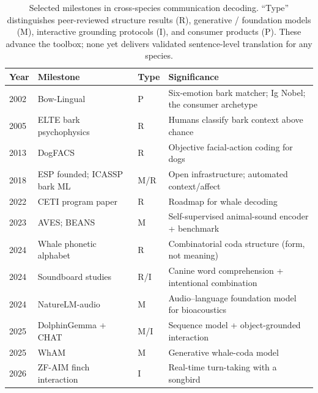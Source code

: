 \begin{table}[htbp]
\centering
\caption{Selected milestones in cross-species communication decoding.
``Type'' distinguishes peer-reviewed structure results (R), generative /
foundation models (M), interactive grounding protocols (I), and consumer
products (P). These advance the toolbox; none yet delivers validated
sentence-level translation for any species.}
\label{tab:milestones}
\small
\begin{tabular}{@{}p{1.0cm}p{4.4cm}p{0.9cm}p{5.7cm}@{}}
\toprule
\textbf{Year} & \textbf{Milestone} & \textbf{Type} & \textbf{Significance} \\
\midrule
2002 & Bow-Lingual~\cite{bowlingual2002} & P & Six-emotion bark matcher; Ig Nobel; the consumer archetype \\
2005 & ELTE bark psychophysics~\cite{pongracz2005barks} & R & Humans classify bark context above chance \\
2013 & DogFACS~\cite{waller2013dogfacs} & R & Objective facial-action coding for dogs \\
2018 & ESP founded; ICASSP bark ML~\cite{icassp2018dogbark} & M/R & Open infrastructure; automated context/affect \\
2022 & CETI program paper~\cite{andreas2022ceti} & R & Roadmap for whale decoding \\
2023 & AVES; BEANS~\cite{hagiwara2023aves,hagiwara2023beans} & M & Self-supervised animal-sound encoder + benchmark \\
2024 & Whale phonetic alphabet~\cite{sharma2024whale} & R & Combinatorial coda structure (form, not meaning) \\
2024 & Soundboard studies~\cite{bastos2024plos,bastos2024scirep} & R/I & Canine word comprehension + intentional combination \\
2024 & NatureLM-audio~\cite{robinson2024naturelm} & M & Audio--language foundation model for bioacoustics \\
2025 & DolphinGemma + CHAT~\cite{google2025dolphingemma} & M/I & Sequence model + object-grounded interaction \\
2025 & WhAM~\cite{wham2025} & M & Generative whale-coda model \\
2026 & ZF-AIM finch interaction~\cite{esp2026finch} & I & Real-time turn-taking with a songbird \\
\bottomrule
\end{tabular}
\end{table}